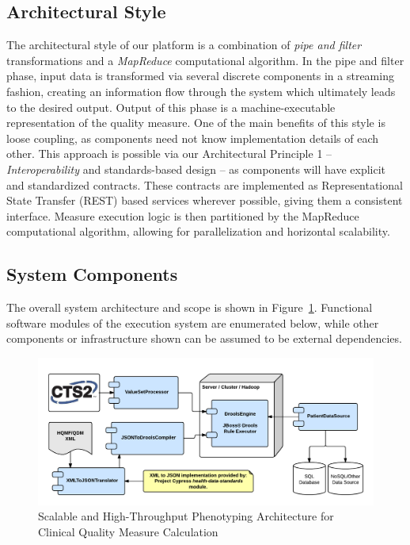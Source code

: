 \documentclass{amia}
\begin{document}
\subsection{Architectural Style}
The architectural style of our platform is a combination of \textit{pipe and filter} transformations and a \textit{MapReduce} computational algorithm. In the pipe and filter phase, input data is transformed via several discrete components in a streaming fashion, creating an information flow through the system which ultimately leads to the desired output\cite{garlan1993introduction}. Output of this phase is a machine-executable representation of the quality measure. One of the main benefits of this style is loose coupling, as components need not know implementation details of each other. This approach is possible via our Architectural Principle 1 -- \textit{Interoperability} and standards-based design -- as components will have explicit and standardized contracts. These contracts are implemented as Representational State Transfer (REST) based services wherever possible, giving them a consistent interface\cite{fielding2002principled}. Measure execution logic is then partitioned by the MapReduce computational algorithm, allowing for parallelization and horizontal scalability.

\subsection{System Components}
The overall system architecture and scope is shown in Figure~\ref{fig:overall_arch}. Functional software modules of the execution system are enumerated below, while other components or infrastructure shown can be assumed to be external dependencies.

\begin{figure}%
\includegraphics[width=\textwidth]{overall-arch}
\caption{Scalable and High-Throughput Phenotyping Architecture for Clinical Quality Measure Calculation} 
\label{fig:overall_arch}
\end{figure}
\end{document}
